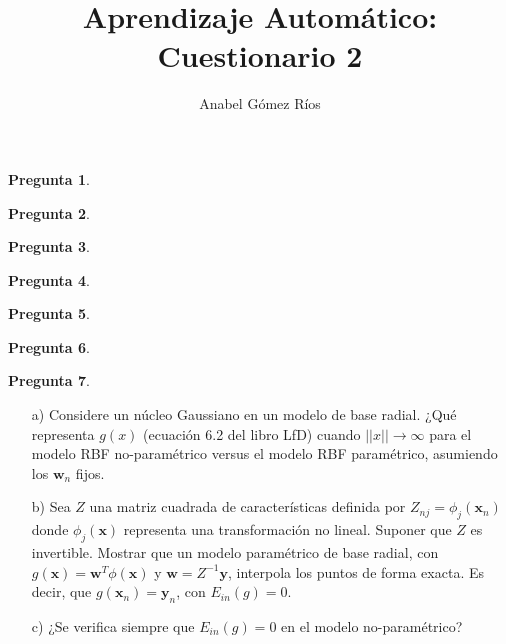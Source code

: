 \documentclass[12pt]{article}
\title{Aprendizaje Automático: Cuestionario 2}
\author{Anabel G\'omez R\'ios}
\theoremstyle{definition}
\begin{document}
\maketitle

\newtheorem{pregunta}{Pregunta}

\begin{pregunta}

\end{pregunta}


\begin{pregunta}

\end{pregunta}


\begin{pregunta}

\end{pregunta}


\begin{pregunta}

\end{pregunta}


\begin{pregunta}

\end{pregunta}


\begin{pregunta}

\end{pregunta}


\begin{pregunta}
\begin{enumerate}
\item[a)] Considere un núcleo Gaussiano en un modelo de base radial. ¿Qué representa $g(x)$ (ecuación 6.2 del libro LfD) cuando $||x|| \rightarrow \infty$ para el modelo RBF no-paramétrico versus el modelo RBF paramétrico, asumiendo los $\mathbf{w}_n$ fijos.
\item[b)] Sea $Z$ una matriz cuadrada de características definida por $Z_{nj} = \phi_j(\mathbf{x}_n)$ donde $\phi_j(\mathbf{x})$ representa una transformación no lineal. Suponer que $Z$ es invertible. Mostrar que un modelo paramétrico de base radial, con $g(\mathbf{x}) = \mathbf{w}^T \phi(\mathbf{x})$ y $\mathbf{w} = Z^{-1}\mathbf{y}$, interpola los puntos de forma exacta. Es decir, que $g(\mathbf{x}_n) = \mathbf{y}_n$, con $E_{in}(g)=0$.
\item[c)] ¿Se verifica siempre que $E_{in}(g)=0$ en el modelo no-paramétrico?
\end{enumerate}


\end{pregunta}
\end{document}
